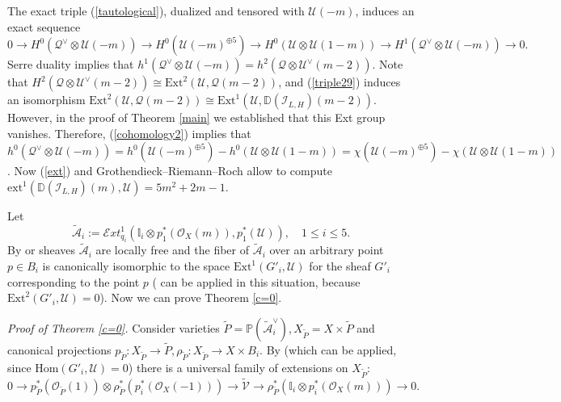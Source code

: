\documentclass{amsart}
\begin{document}
The exact triple (\ref{tautological}), dualized and tensored with $\mathcal U(-m)$, induces an exact sequence
\begin{equation}\label{cohomology2}0\to H^0(\mathcal Q^\vee\otimes\mathcal U(-m))\to H^0(\mathcal U(-m)^{\oplus 5})\to H^0(\mathcal U\otimes\mathcal U(1-m))\to H^1(\mathcal Q^\vee\otimes\mathcal U(-m))\to 0.
\end{equation}
Serre duality implies that $h^1(\mathcal Q^\vee\otimes\mathcal U(-m))=h^2(\mathcal Q\otimes\mathcal U^\vee(m-2))$. Note that $H^2(\mathcal Q\otimes\mathcal U^\vee(m-2))\cong\mathrm{Ext}^2(\mathcal U,\mathcal Q(m-2))$, and (\ref{triple29}) induces an isomorphism $\mathrm{Ext}^2(\mathcal U,\mathcal Q(m-2))\cong\mathrm{Ext}^1(\mathcal U,\mathbb D(\mathcal I_{L,H})(m-2))$. However, in the proof of Theorem \ref{main} we established that this Ext group vanishes. Therefore, (\ref{cohomology2}) implies that $h^0(\mathcal Q^\vee\otimes\mathcal U(-m))=h^0(\mathcal U(-m)^{\oplus 5})-h^0(\mathcal U\otimes\mathcal U(1-m))=\chi(\mathcal U(-m)^{\oplus 5})-\chi(\mathcal U\otimes\mathcal U(1-m))$. Now (\ref{ext}) and Grothendieck--Riemann--Roch allow to compute $\mathrm{ext}^1(\mathbb D(\mathcal I_{L,H})(m),\mathcal U)=5m^2+2m-1$.

Let 
\begin{equation}\label{tilde A}\widetilde{\mathcal A}_i:=\mathcal Ext_{q_i}^1(\mathbb I_i\otimes p_1^*(\mathcal O_X(m)),p_1^*(\mathcal U)),\quad 1\le i\le 5.\end{equation}  
By \cite[Satz 3.(ii)]{BPS} or \cite[Theorem 1.4]{Lan} sheaves $\widetilde{\mathcal A}_i$ are locally free and the fiber of $\widetilde{\mathcal A}_i$ over an arbitrary point $p\in B_i$ is canonically isomorphic to the space $\mathrm{Ext}^1(G'_i,\mathcal U)$ for the sheaf $G'_i$ corresponding to the point $p$ (\cite[Theorem 1.4]{Lan} can be applied in this situation, because $\mathrm{Ext}^2(G'_i,\mathcal U)=0$). Now we can prove Theorem \ref{c=0}.

\textit{Proof of Theorem \ref{c=0}.} Consider varieties $\widetilde{P}=\mathbb P(\widetilde{\mathcal A}_i^\vee),X_{\widetilde{P}}=X\times \widetilde{P}$ and canonical projections $p_{\widetilde{P}}:X_{\widetilde{P}}\to \widetilde{P},\rho_{\widetilde{P}}:X_{\widetilde{P}}\to X\times B_i$. By \cite[Corollary 4.5]{Lan} (which can be applied, since $\mathrm{Hom}(G'_i,\mathcal U)=0$) there is a universal family of extensions on $X_{\widetilde{P}}$:
	\begin{equation}0\to p_{\widetilde{P}}^*(\mathcal O_{\widetilde{P}}(1))\otimes\rho_{\widetilde{P}}^*(p_i^*(\mathcal O_X(-1)))\to\widetilde{\mathcal V}\to\rho_{\widetilde{P}}^*(\mathbb I_i\otimes p_i^*(\mathcal O_X(m)))\to 0.
	\end{equation}
	
\end{document}
